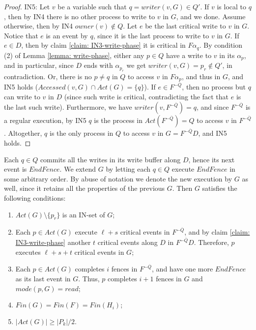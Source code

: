 \begin{proof}
	IN5: Let $v$ be a variable such that $q = writer(v,G) \in Q'$. If $v$ is local to $q$, then by IN4 there is no other process to write to $v$ in $G$, and we done. Assume otherwise, then by IN4 $owner(v) \notin Q$. Let $e$ be the last critical write to $v$ in $G$. Notice that $e$ is an event by $q$, since it is the last process to write to $v$ in $G$.
	If $e \in D$, then by claim \ref{claim: IN3-write-phase} it is critical in $F \alpha_q$. By condition (2) of Lemma \ref{lemma: write-phase}, either any $p \in Q$ have a write to $v$ in its $\alpha_p$, and in particular, since $D$ ends with $\alpha_{p_r}$ we get $writer(v,G) = p_r \notin Q'$, in contradiction. Or, there is no $p \neq q$ in $Q$ to access $v$ in $F \alpha_p$, and thus in $G$, and IN5 holds ($Accessed(v,G) \cap Act(G) =\{q\}$).
	If $e \in F^{-\overline{Q}}$, then no process but $q$ can write to $v$ in $D$ (since such write is critical, contradicting the fact that $e$ is the last such write). Furthermore, we have $writer(v,F^{-\overline{Q}}) = q$, and since $F^{-\overline{Q}}$ is a regular execution, by IN5 $q$ is the process in $Act(F^{-\overline{Q}}) = Q$ to access $v$ in $F^{-\overline{Q}}$. Altogether, $q$ is the only process in $Q$ to access $v$ in $G = F^{-\overline{Q}} D$, and IN5 holds.
\end{proof}

Each $q \in Q$ commits all the writes in its write buffer along $D$, hence its next event is $EndFence$. We extend $G$ by letting each $q \in Q$ execute $EndFence$ in some arbitrary order. By abuse of notation we denote the new execution by $G$ as well, since it retains all the properties of the previous $G$. Then $G$ satisfies the following conditions:
\begin{enumerate}[(1)]
	\item $Act(G) \setminus \{p_r\}$ is an IN-set of $G$;
	\item Each $p \in Act(G)$ execute $\ell+s$ critical events in $F^{-\overline{Q}}$, and by claim \ref{claim: IN3-write-phase} another $t$ critical events along $D$ in $F^{-\overline{Q}} D$. Therefore, $p$ executes $\ell+s+t$ critical events in $G$;
	\item Each $p \in Act(G)$ completes $i$ fences in $F^{-\overline{Q}}$, and have one more $EndFence$ as its last event in $G$. Thus, $p$ completes $i+1$ fences in $G$ and $mode(p,G) = read$;
	\item $Fin(G) = Fin(F) = Fin(H_i)$;
	\item $|Act(G)| \geq |P_k|/2$.
\end{enumerate}

